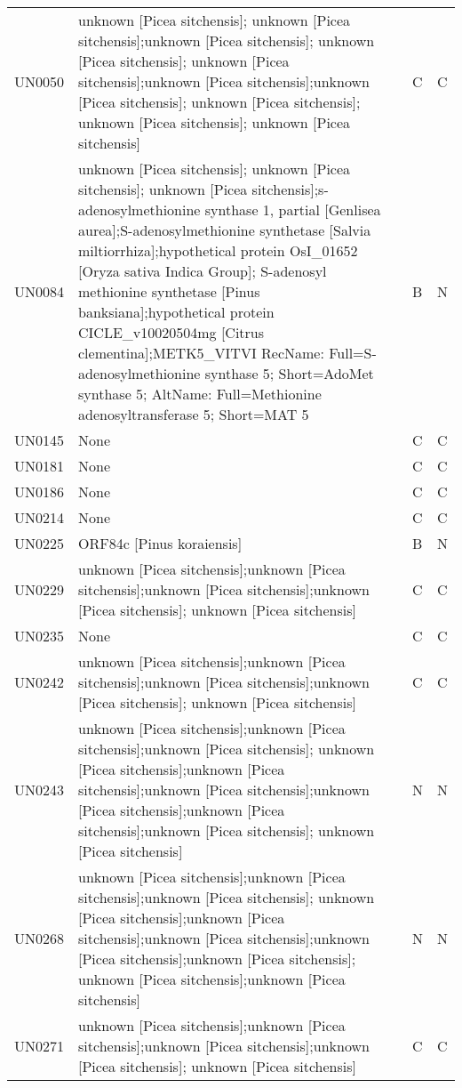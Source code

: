 \begin{longtable}{llll}
\bottomrule
\endlastfoot
UN0050 &   unknown [Picea sitchensis]; unknown [Picea sitchensis];unknown [Picea sitchensis]; unknown [Picea sitchensis]; unknown [Picea sitchensis];unknown [Picea sitchensis];unknown [Picea sitchensis]; unknown [Picea sitchensis]; unknown [Picea sitchensis]; unknown [Picea sitchensis] &  C &  C \\
UN0084 &   unknown [Picea sitchensis]; unknown [Picea sitchensis]; unknown [Picea sitchensis];s-adenosylmethionine synthase 1, partial [Genlisea aurea];S-adenosylmethionine synthetase [Salvia miltiorrhiza];hypothetical protein OsI\_01652 [Oryza sativa Indica Group]; S-adenosyl methionine synthetase [Pinus banksiana];hypothetical protein CICLE\_v10020504mg [Citrus clementina];METK5\_VITVI RecName: Full=S-adenosylmethionine synthase 5; Short=AdoMet synthase 5; AltName: Full=Methionine adenosyltransferase 5; Short=MAT 5 &  B &  N \\
UN0145 &  None &  C &  C \\
UN0181 &  None &  C &  C \\
UN0186 &  None &  C &  C \\
UN0214 &  None &  C &  C \\
UN0225 &  ORF84c [Pinus koraiensis] &  B &  N \\
UN0229 &  unknown [Picea sitchensis];unknown [Picea sitchensis];unknown [Picea sitchensis];unknown [Picea sitchensis]; unknown [Picea sitchensis] &  C &  C \\
UN0235 &  None &  C &  C \\
UN0242 &  unknown [Picea sitchensis];unknown [Picea sitchensis];unknown [Picea sitchensis];unknown [Picea sitchensis]; unknown [Picea sitchensis] &  C &  C \\
UN0243 &  unknown [Picea sitchensis];unknown [Picea sitchensis];unknown [Picea sitchensis]; unknown [Picea sitchensis];unknown [Picea sitchensis];unknown [Picea sitchensis];unknown [Picea sitchensis];unknown [Picea sitchensis];unknown [Picea sitchensis]; unknown [Picea sitchensis] &  N &  N \\
UN0268 &  unknown [Picea sitchensis];unknown [Picea sitchensis];unknown [Picea sitchensis]; unknown [Picea sitchensis];unknown [Picea sitchensis];unknown [Picea sitchensis];unknown [Picea sitchensis];unknown [Picea sitchensis]; unknown [Picea sitchensis];unknown [Picea sitchensis] &  N &  N \\
UN0271 &  unknown [Picea sitchensis];unknown [Picea sitchensis];unknown [Picea sitchensis];unknown [Picea sitchensis]; unknown [Picea sitchensis] &  C &  C \\

\end{longtable}
